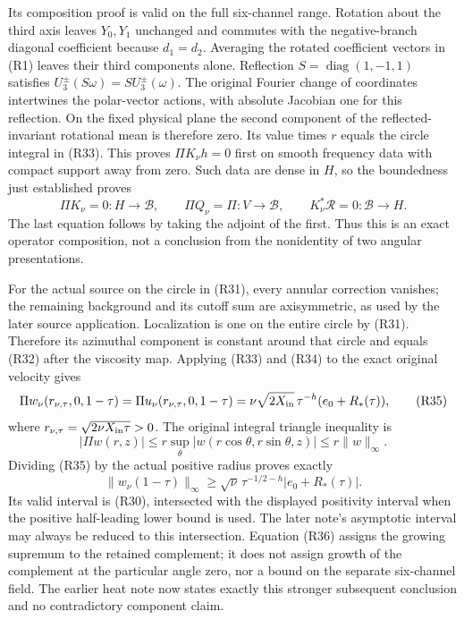 Its composition proof is valid on the full six-channel range. Rotation about the third axis leaves \(Y_0,Y_1\) unchanged and commutes with the negative-branch diagonal coefficient because \(d_1=d_2\). Averaging the rotated coefficient vectors in (R1) leaves their third components alone. Reflection \(S=\operatorname{diag}(1,-1,1)\) satisfies \(U_3^\pm(S\omega)=S U_3^\pm(\omega)\). The original Fourier change of coordinates intertwines the polar-vector actions, with absolute Jacobian one for this reflection. On the fixed physical plane the second component of the reflected-invariant rotational mean is therefore zero. Its value times \(r\) equals the circle integral in (R33). This proves \(\Pi K_\nu h=0\) first on smooth frequency data with compact support away from zero. Such data are dense in \(H\), so the boundedness just established proves \[
\Pi K_\nu=0:H\to\mathcal B,
\qquad \Pi Q_\nu=\Pi:V\to\mathcal B,
\qquad K_\nu^*\mathcal R=0:\mathcal B\to H.
\tag{R34}
\] The last equation follows by taking the adjoint of the first. Thus this is an exact operator composition, not a conclusion from the nonidentity of two angular presentations.

For the actual source on the circle in (R31), every annular correction vanishes; the remaining background and its cutoff sum are axisymmetric, as used by the later source application. Localization is one on the entire circle by (R31). Therefore its azimuthal component is constant around that circle and equals (R32) after the viscosity map. Applying (R33) and (R34) to the exact original velocity gives \[
\Pi w_\nu(r_{\nu,\tau},0,1-\tau)
=\Pi u_\nu(r_{\nu,\tau},0,1-\tau)
=\nu\sqrt{2X_{\rm in}}\,\tau^{-h}(e_0+R_*(\tau)),
\tag{R35}
\] where \(r_{\nu,\tau}=\sqrt{2\nu X_{\rm in}\tau}>0\). The original integral triangle inequality is \[
|\Pi w(r,z)|\le r\sup_\theta|w(r\cos\theta,r\sin\theta,z)|
\le r\|w\|_\infty.
\] Dividing (R35) by the actual positive radius proves exactly \[
\|w_\nu(1-\tau)\|_\infty
\ge\sqrt\nu\,\tau^{-1/2-h}|e_0+R_*(\tau)|.
\tag{R36}
\] Its valid interval is (R30), intersected with the displayed positivity interval when the positive half-leading lower bound is used. The later note's asymptotic interval may always be reduced to this intersection. Equation (R36) assigns the growing supremum to the retained complement; it does not assign growth of the complement at the particular angle zero, nor a bound on the separate six-channel field. The earlier heat note now states exactly this stronger subsequent conclusion and no contradictory component claim.

